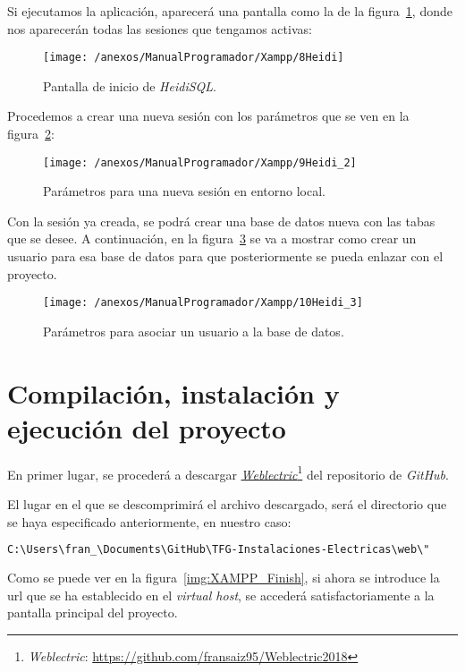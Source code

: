 Si ejecutamos la aplicación, aparecerá una pantalla como la de la figura~\ref{img:Heidi}, donde nos aparecerán todas las sesiones que tengamos activas:

\begin{figure}[h]
	\centering
	\texttt{[image: /anexos/ManualProgramador/Xampp/8Heidi]}
	\caption{Pantalla de inicio de \textit{HeidiSQL}.}
	\label{img:Heidi}
\end{figure}

Procedemos a crear una nueva sesión con los parámetros que se ven en la figura~\ref{img:Heidi_2}:

\begin{figure}[h]
	\centering
	\texttt{[image: /anexos/ManualProgramador/Xampp/9Heidi\_2]}
	\caption{Parámetros para una nueva sesión en entorno local.}
	\label{img:Heidi_2}
\end{figure}

Con la sesión ya creada, se podrá crear una base de datos nueva con las tabas que se desee. A continuación, en la figura~\ref{img:Heidi_3} se va a mostrar como crear un usuario para esa base de datos para que posteriormente se pueda enlazar con el proyecto. 

\begin{figure}[h]
	\centering
	\texttt{[image: /anexos/ManualProgramador/Xampp/10Heidi\_3]}
	\caption{Parámetros para asociar un usuario a la base de datos.}
	\label{img:Heidi_3}
\end{figure}

\newpage


\section{Compilación, instalación y ejecución del proyecto}

En primer lugar, se procederá a descargar \href{https://github.com/fransaiz95/Weblectric2018}{\textit{Weblectric}}\footnote{\textit{Weblectric}: \url{https://github.com/fransaiz95/Weblectric2018}} del repositorio de \textit{GitHub}.

El lugar en el que se descomprimirá el archivo descargado, será el directorio que se haya especificado anteriormente, en nuestro caso:
\begin{lstlisting}[language=bash]
C:\Users\fran_\Documents\GitHub\TFG-Instalaciones-Electricas\web\"
\end{lstlisting}

Como se puede ver en la figura~\ref{img:XAMPP_Finish}, si ahora se introduce la url que se ha establecido en el \textit{virtual host}, se accederá satisfactoriamente a la pantalla principal del proyecto.

